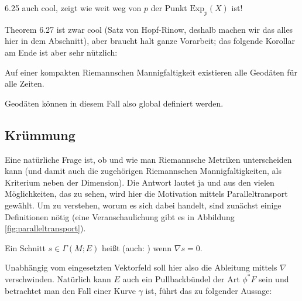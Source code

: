 \documentclass[../H_Analysis_main.tex]{subfiles}
\begin{document}
6.25 auch cool, zeigt wie weit weg von $p$ der Punkt $\text{Exp}_p(X)$ ist!


Theorem 6.27 ist zwar cool (Satz von Hopf-Rinow, deshalb machen wir das alles hier in dem Abschnitt), aber braucht halt ganze Vorarbeit; das folgende Korollar am Ende ist aber sehr nützlich:



\begin{cor}
Auf einer kompakten Riemannschen Mannigfaltigkeit existieren alle Geodäten für alle Zeiten.
\end{cor}
Geodäten können in diesem Fall also global definiert werden.



		\subsection{Krümmung}
Eine natürliche Frage ist, ob und wie man Riemannsche Metriken unterscheiden kann (und damit auch die zugehörigen Riemannschen Mannigfaltigkeiten, als Kriterium neben der Dimension). Die Antwort lautet ja und aus den vielen Möglichkeiten, das zu sehen, wird hier die Motivation mittels Paralleltransport gewählt. Um zu verstehen, worum es sich dabei handelt, sind zunächst einige Definitionen nötig (eine Veranschaulichung gibt es in Abbildung \ref{fig:paralleltransport}).

\begin{defi}
Ein Schnitt $s \in \Gamma(M; E)$ heißt  (auch: ) wenn $\nabla s = 0$.
\end{defi}

Unabhängig vom eingesetzten Vektorfeld soll hier also die Ableitung mittels $\nabla$ verschwinden. Natürlich kann $E$ auch ein Pullbackbündel der Art $\phi^* F$ sein und betrachtet man den Fall einer Kurve $\gamma$ ist, führt das zu folgender Aussage:

\iffalse %
\begin{bsp}

paralleler Schnitt für Linearen Zusammenhang ist Vektorfeld $\nabla_Y X = 0 \in \Gamma(M; T^*M \otimes TM)$ für ein beliebiges $Y \in \mathcal{X}(M)$, man schreibt oft auch einfach $\nabla X = 0$ in diesem Fall

paralleler Schnitt für Zusammenhang auf $E = TM^*$ ist 1-Form $\nabla_Y \omega = 0 \in \Gamma(M; TM \otimes T^*M)$ für ein beliebiges $Y \in \mathcal{X}(M)$


für Vektorfelder heißt das: $X$ ändert sich nicht wenn wir uns die Werte entlang eines Vektorfeldes $Y$ angucken, das nennt man dann parallel; allgemeiner, z.B.~eben für 1-Formen, ist da das Wort konstant vermutlich passender
\end{bsp}
\fi
\end{document}
